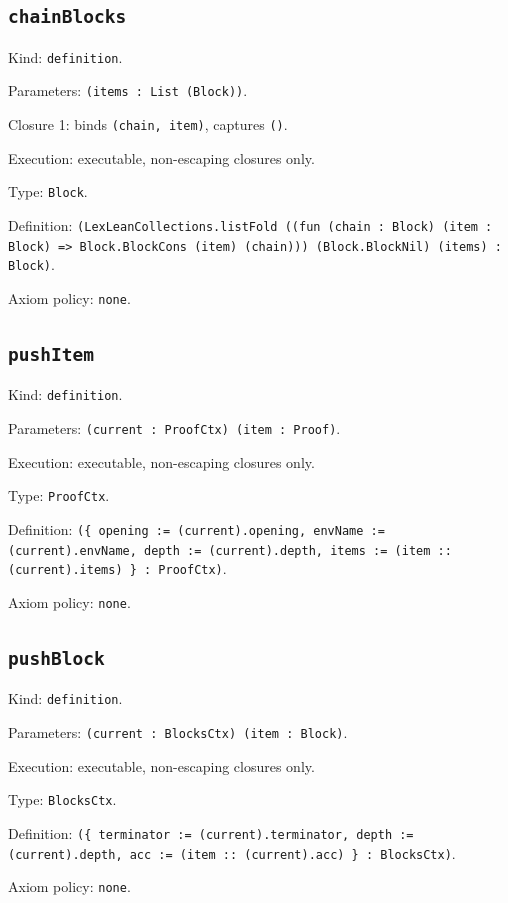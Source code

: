 \documentclass[11pt]{article}
\begin{document}
\subsection*{\texttt{chainBlocks}}
\noindent Kind: \texttt{definition}.\par
\noindent Parameters: \texttt{(items : List (Block))}.\par
\noindent Closure 1: binds \texttt{(chain, item)}, captures \texttt{()}.\par
\noindent Execution: executable, non-escaping closures only.\par
\noindent Type: \texttt{Block}.\par
\noindent Definition: \texttt{(LexLeanCollections.listFold ((fun (chain : Block) (item : Block) => Block.BlockCons (item) (chain))) (Block.BlockNil) (items) : Block)}.\par
\noindent Axiom policy: \texttt{none}.\par
\subsection*{\texttt{pushItem}}
\noindent Kind: \texttt{definition}.\par
\noindent Parameters: \texttt{(current : ProofCtx) (item : Proof)}.\par
\noindent Execution: executable, non-escaping closures only.\par
\noindent Type: \texttt{ProofCtx}.\par
\noindent Definition: \texttt{(\{ opening := (current).opening, envName := (current).envName, depth := (current).depth, items := (item :: (current).items) \} : ProofCtx)}.\par
\noindent Axiom policy: \texttt{none}.\par
\subsection*{\texttt{pushBlock}}
\noindent Kind: \texttt{definition}.\par
\noindent Parameters: \texttt{(current : BlocksCtx) (item : Block)}.\par
\noindent Execution: executable, non-escaping closures only.\par
\noindent Type: \texttt{BlocksCtx}.\par
\noindent Definition: \texttt{(\{ terminator := (current).terminator, depth := (current).depth, acc := (item :: (current).acc) \} : BlocksCtx)}.\par
\noindent Axiom policy: \texttt{none}.\par
\end{document}
